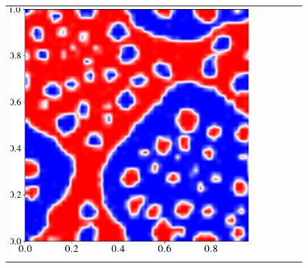 \documentclass[12pt, reqno]{report}
\theoremstyle{definition}
\theoremstyle{remark}
\begin{document}
\begin{figure}[H]
\begin{tabular}{rccccc}
        \includegraphics[align = c, height=\subheight]{media_paper/end_AC_cmap_MD_n=1000.png} \\


\end{tabular}
\end{figure}
\end{document}
